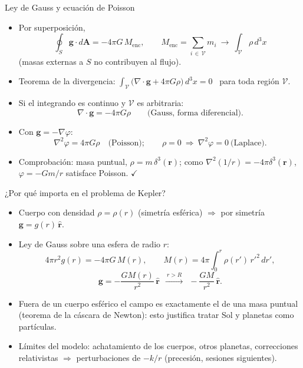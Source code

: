 \documentclass[spanish]{beamer}
\newcommand{\vr}{\mathbf r}
\newcommand{\ur}{\hat{\mathbf r}}
\begin{document}
\begin{frame}{Ley de Gauss y ecuación de Poisson}
\begin{itemize}
\item<1-> Por superposición,
\[\oint_S\mathbf g\cdot d\mathbf A=-4\pi G\,M_{\mathrm{enc}},\qquad
M_{\mathrm{enc}}=\sum_{i\,\in\,\mathcal V}m_i\ \longrightarrow\ \int_{\mathcal V}\rho\,d^3x
\]
(masas externas a $S$ no contribuyen al flujo).
\item<2-> Teorema de la divergencia:
\(\displaystyle\int_{\mathcal V}\big(\nabla\cdot\mathbf g+4\pi G\rho\big)\,d^3x=0\) \ para toda región $\mathcal V$.
\item<3-> Si el integrando es continuo y $\mathcal V$ es arbitraria:
\[\nabla\cdot\mathbf g=-4\pi G\rho \qquad\text{(Gauss, forma diferencial).}\]
\item<4-> Con $\mathbf g=-\nabla\varphi$:
\[\boxed{\nabla^2\varphi=4\pi G\rho}\quad\text{(Poisson)};\qquad \rho=0\ \Rightarrow\ \nabla^2\varphi=0\ \text{(Laplace)}.\]
\item<5-> Comprobación: masa puntual, $\rho=m\,\delta^3(\vr)$; como $\nabla^2(1/r)=-4\pi\delta^3(\vr)$, $\varphi=-Gm/r$ satisface Poisson. $\checkmark$
\end{itemize}
\end{frame}

\begin{frame}{¿Por qué importa en el problema de Kepler?}
\begin{itemize}
\item<1-> Cuerpo con densidad $\rho=\rho(r)$ (simetría esférica) $\Rightarrow$ por simetría $\mathbf g=g(r)\,\ur$.
\item<2-> Ley de Gauss sobre una esfera de radio $r$:
\[4\pi r^2g(r)=-4\pi G\,M(r),\qquad M(r)=4\pi\int_0^r\rho(r')\,r'^2\,dr' ,\]
\[\mathbf g=-\frac{GM(r)}{r^2}\,\ur\ \ \xrightarrow{\ r>R\ }\ \ -\frac{GM}{r^2}\,\ur .\]
\item<3-> Fuera de un cuerpo esférico el campo es \alert{exactamente} el de una masa puntual (teorema de la cáscara de Newton): esto justifica tratar Sol y planetas como partículas.
\item<4-> Límites del modelo: achatamiento de los cuerpos, otros planetas, correcciones relativistas $\Rightarrow$ perturbaciones de $-k/r$ (precesión, sesiones siguientes).
\end{itemize}
\end{frame}
\end{document}
